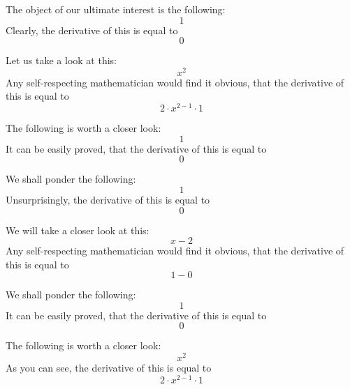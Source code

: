 \documentclass{article}
\begin{document}
The object of our ultimate interest is the following:
\begin{equation}
1 
\end{equation}
Clearly, the derivative of this is equal to
\begin{equation}
0 
\end{equation}

Let us take a look at this:
\begin{equation}
x ^{2 } 
\end{equation}
Any self-respecting mathematician would find it obvious, that the derivative of this is equal to
\begin{equation}
2 \cdot x ^{2 - 1 } \cdot 1 
\end{equation}

The following is worth a closer look:
\begin{equation}
1 
\end{equation}
It can be easily proved, that the derivative of this is equal to
\begin{equation}
0 
\end{equation}

We shall ponder the following:
\begin{equation}
1 
\end{equation}
Unsurprisingly, the derivative of this is equal to
\begin{equation}
0 
\end{equation}

We will take a closer look at this:
\begin{equation}
x - 2 
\end{equation}
Any self-respecting mathematician would find it obvious, that the derivative of this is equal to
\begin{equation}
1 - 0 
\end{equation}

We shall ponder the following:
\begin{equation}
1 
\end{equation}
It can be easily proved, that the derivative of this is equal to
\begin{equation}
0 
\end{equation}

The following is worth a closer look:
\begin{equation}
x ^{2 } 
\end{equation}
As you can see, the derivative of this is equal to
\begin{equation}
2 \cdot x ^{2 - 1 } \cdot 1 
\end{equation}
\end{document}
